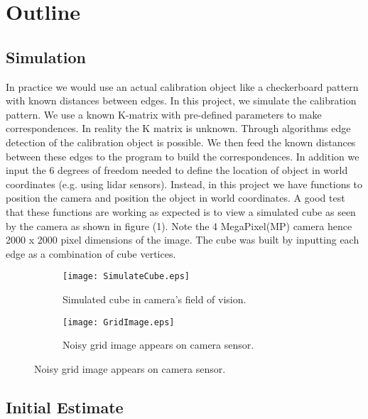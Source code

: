 \documentclass[titlepage]{article}
\begin{document}
\section{Outline}
\subsection{Simulation}
In practice we would use an actual calibration object like a checkerboard pattern with known distances between edges. In this project, we simulate the calibration pattern. We use a known K-matrix with pre-defined parameters to make correspondences.
In reality the K matrix is unknown. Through algorithms edge detection of the calibration object is possible. We then feed the known distances between these edges to the program to build the correspondences. In addition we input the 6 degrees of freedom needed to define the location of object in world coordinates (e.g. using lidar sensors). Instead, in this project we have functions to position the camera and position the object in world coordinates. A good test that these functions are working as expected is to view a simulated cube as seen by the camera as shown in figure (1). Note the 4 MegaPixel(MP) camera hence 2000 x 2000 pixel dimensions of the image. The cube was built by inputting each edge as a combination of cube vertices.
\begin{figure}
\begin{subfigure}{0.5\textwidth}
\texttt{[image: SimulateCube.eps]}
\caption{Simulated cube in camera's field of vision.}
\label{wrap-fig:9}
\end{subfigure}
\begin{subfigure}{0.5\textwidth}
\texttt{[image: GridImage.eps]}
\caption{Noisy grid image appears on camera sensor.}
\label{noisy-grid}
\end{subfigure}
\end{figure}
%
\subsection{Initial Estimate}
\end{document}
